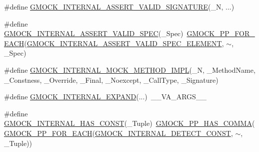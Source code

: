 \begin{DoxyCompactItemize}
\item 
\#define \mbox{\hyperlink{googletest-master_2googlemock_2include_2gmock_2gmock-function-mocker_8h_a8482159ed8d8653920702922d6336942}{G\+M\+O\+C\+K\+\_\+\+I\+N\+T\+E\+R\+N\+A\+L\+\_\+\+A\+S\+S\+E\+R\+T\+\_\+\+V\+A\+L\+I\+D\+\_\+\+S\+I\+G\+N\+A\+T\+U\+RE}}(\+\_\+N, ...)
\item 
\#define \mbox{\hyperlink{googletest-master_2googlemock_2include_2gmock_2gmock-function-mocker_8h_a0007a0efee3360bb4b5478b597e35ee7}{G\+M\+O\+C\+K\+\_\+\+I\+N\+T\+E\+R\+N\+A\+L\+\_\+\+A\+S\+S\+E\+R\+T\+\_\+\+V\+A\+L\+I\+D\+\_\+\+S\+P\+EC}}(\+\_\+\+Spec)~\mbox{\hyperlink{_obj__test_2lib_2googletest-master_2googlemock_2include_2gmock_2internal_2gmock-pp_8h_abc9368d9b0960531e3cfb9e5d6a41816}{G\+M\+O\+C\+K\+\_\+\+P\+P\+\_\+\+F\+O\+R\+\_\+\+E\+A\+CH}}(\mbox{\hyperlink{_obj__test_2lib_2googletest-master_2googlemock_2include_2gmock_2gmock-function-mocker_8h_a6043d8b0a21556d205e729fa9c8da600}{G\+M\+O\+C\+K\+\_\+\+I\+N\+T\+E\+R\+N\+A\+L\+\_\+\+A\+S\+S\+E\+R\+T\+\_\+\+V\+A\+L\+I\+D\+\_\+\+S\+P\+E\+C\+\_\+\+E\+L\+E\+M\+E\+NT}}, $\sim$, \+\_\+\+Spec)
\item 
\#define \mbox{\hyperlink{googletest-master_2googlemock_2include_2gmock_2gmock-function-mocker_8h_ad1e468db8897a7e26c6223b94da046a6}{G\+M\+O\+C\+K\+\_\+\+I\+N\+T\+E\+R\+N\+A\+L\+\_\+\+M\+O\+C\+K\+\_\+\+M\+E\+T\+H\+O\+D\+\_\+\+I\+M\+PL}}(\+\_\+N,  \+\_\+\+Method\+Name,  \+\_\+\+Constness,  \+\_\+\+Override,  \+\_\+\+Final,  \+\_\+\+Noexcept,  \+\_\+\+Call\+Type,  \+\_\+\+Signature)
\item 
\#define \mbox{\hyperlink{googletest-master_2googlemock_2include_2gmock_2gmock-function-mocker_8h_a89ec7e283a9d924e9cfd92d45b9bbebd}{G\+M\+O\+C\+K\+\_\+\+I\+N\+T\+E\+R\+N\+A\+L\+\_\+\+E\+X\+P\+A\+ND}}(...)~\+\_\+\+\_\+\+V\+A\+\_\+\+A\+R\+G\+S\+\_\+\+\_\+
\item 
\#define \mbox{\hyperlink{googletest-master_2googlemock_2include_2gmock_2gmock-function-mocker_8h_a3fc6f99ce89d5117fcc366d44423a9f2}{G\+M\+O\+C\+K\+\_\+\+I\+N\+T\+E\+R\+N\+A\+L\+\_\+\+H\+A\+S\+\_\+\+C\+O\+N\+ST}}(\+\_\+\+Tuple)~\mbox{\hyperlink{_obj__test_2lib_2googletest-master_2googlemock_2include_2gmock_2internal_2gmock-pp_8h_aaf83e01e56eb26d7eac9efb477587510}{G\+M\+O\+C\+K\+\_\+\+P\+P\+\_\+\+H\+A\+S\+\_\+\+C\+O\+M\+MA}}(\mbox{\hyperlink{_obj__test_2lib_2googletest-master_2googlemock_2include_2gmock_2internal_2gmock-pp_8h_abc9368d9b0960531e3cfb9e5d6a41816}{G\+M\+O\+C\+K\+\_\+\+P\+P\+\_\+\+F\+O\+R\+\_\+\+E\+A\+CH}}(\mbox{\hyperlink{_obj__test_2lib_2googletest-master_2googlemock_2include_2gmock_2gmock-function-mocker_8h_a3db348fab7c9ba65b3c9f4a7c1a9b3cc}{G\+M\+O\+C\+K\+\_\+\+I\+N\+T\+E\+R\+N\+A\+L\+\_\+\+D\+E\+T\+E\+C\+T\+\_\+\+C\+O\+N\+ST}}, $\sim$, \+\_\+\+Tuple))

\end{DoxyCompactItemize}
